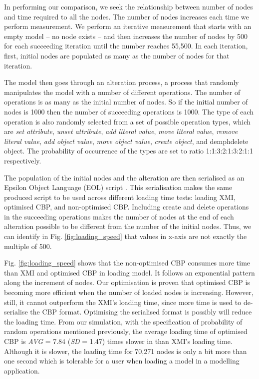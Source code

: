 \documentclass{llncs}
\begin{document}
In performing our comparison, we seek the relationship between number of nodes and time required to all the nodes. The number of nodes increases each time we perform measurement. We perform an iterative measurement that starts with an empty model -- no node exists -- and then increases the number of nodes by 500 for each succeeding iteration until the number reaches 55,500. In each iteration, first, initial nodes are populated as many as the number of nodes for that iteration. 

The model then goes through an alteration process, a process that randomly manipulates the model with a number of different operations. The number of operations is as many as the initial number of nodes. So if the initial number of nodes is 1000 then the number of succeeding operations is 1000. The type of each operation is also randomly selected from a set of possible operation types, which are \emph{set attribute}, \emph{unset attribute}, \emph{add literal value}, \emph{move literal value}, \emph{remove literal value}, \emph{add object value}, \emph{move object value}, \emph{create object}, and demph{delete object}. The probability of occurrence of the types are set to ratio 1:1:3:2:1:3:2:1:1 respectively. 

The population of the initial nodes and the alteration are then serialised as an Epsilon Object Language (EOL) script \cite{kolovos2006epsilon}. This serialisation makes the same produced script to be used across different loading time tests: loading XMI, optimised CBP, and non-optimised CBP. Including create and delete operations in the succeeding operations makes the number of nodes at the end of each alteration possible to be different from the number of the initial nodes. Thus, we can identify in Fig. \ref{fig:loading_speed} that values in x-axis are not exactly the multiple of 500.    

Fig. \ref{fig:loading_speed} shows that the non-optimised CBP consumes more time than XMI and optimised CBP in loading model. It follows an exponential pattern along the increment of nodes. Our optimisation is proven that optimised CBP is becoming more efficient when the number of loaded nodes is increasing. However, still, it cannot outperform the XMI's loading time, since more time is used to de-serialise the CBP format. Optimising the serialised format is possibly will reduce the loading time. From our simulation, with the specification of probability of random operations mentioned previously, the average loading time of optimised CBP is \emph{AVG} = 7.84 (\emph{SD} = 1.47) times slower in than XMI's loading time. Although it is slower, the loading time for 70,271 nodes is only a bit more than one second which is tolerable for a user when loading a model in a modelling application. 
\end{document}
